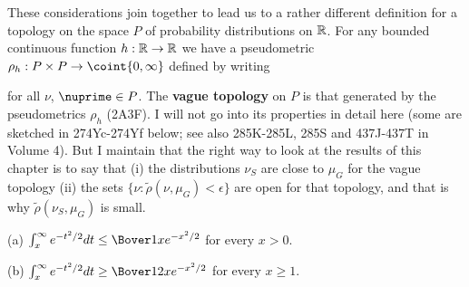 { These considerations join together to lead us to
a rather different definition for a topology on the space $P$ of
probability distributions on $\Bbb R$.   For any bounded continuous function $h:\Bbb R\to\Bbb R$ we have a pseudometric
$\rho_h:P\times P\to\coint{0,\infty}$
defined by writing


\noindent for all $\nu$, $\nuprime\in P$.   The {\bf vague topology} on $P$
is that generated by the pseudometrics $\rho_h$ (2A3F).   I will
not go into its properties in detail here (some are sketched in
274Yc-274Yf %
below;  see also 285K-285L, 285S and 437J-437T
in Volume 4).  But I maintain that the right way to look at the
results of this chapter is to say that (i) the distributions $\nu_S$ are
close to $\mu_G$ for the vague topology (ii) the sets
$\{\nu:\tilde\rho(\nu,\mu_G)<\epsilon\}$ are open for that topology, and
that is why $\tilde\rho(\nu_S,\mu_G)$ is small.
}%

 (a)
$\int_x^{\infty}e^{-t^2/2}dt\le\Bover1xe^{-x^2/2}$ for every $x>0$.

(b) $\int_x^{\infty}e^{-t^2/2}dt\ge\Bover1{2x}e^{-x^2/2}$ for every
$x\ge 1$.


